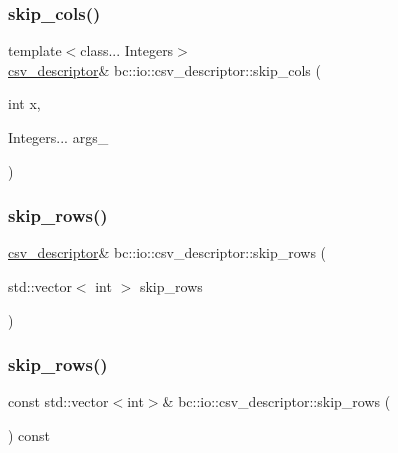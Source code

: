 \subsubsection{\texorpdfstring{skip\+\_\+cols()}{skip\_cols()}\hspace{0.1cm}{\footnotesize\ttfamily [3/3]}}
{\footnotesize\ttfamily template$<$class... Integers$>$ \\
\hyperlink{structbc_1_1io_1_1csv__descriptor}{csv\+\_\+descriptor}\& bc\+::io\+::csv\+\_\+descriptor\+::skip\+\_\+cols (\begin{DoxyParamCaption}\item[{int}]{x,  }\item[{Integers...}]{args\+\_\+ }\end{DoxyParamCaption})\hspace{0.3cm}{\ttfamily [inline]}}

\mbox{\label{structbc_1_1io_1_1csv__descriptor_aee7eba21b2d7bd430dbb8b48c1f3f0e1}} 
\subsubsection{\texorpdfstring{skip\+\_\+rows()}{skip\_rows()}\hspace{0.1cm}{\footnotesize\ttfamily [1/3]}}
{\footnotesize\ttfamily \hyperlink{structbc_1_1io_1_1csv__descriptor}{csv\+\_\+descriptor}\& bc\+::io\+::csv\+\_\+descriptor\+::skip\+\_\+rows (\begin{DoxyParamCaption}\item[{std\+::vector$<$ int $>$}]{skip\+\_\+rows }\end{DoxyParamCaption})\hspace{0.3cm}{\ttfamily [inline]}}

\mbox{\label{structbc_1_1io_1_1csv__descriptor_a1f40717ae361ae4266b7efbcef43284a}} 
\subsubsection{\texorpdfstring{skip\+\_\+rows()}{skip\_rows()}\hspace{0.1cm}{\footnotesize\ttfamily [2/3]}}
{\footnotesize\ttfamily const std\+::vector$<$int$>$\& bc\+::io\+::csv\+\_\+descriptor\+::skip\+\_\+rows (\begin{DoxyParamCaption}{ }\end{DoxyParamCaption}) const\hspace{0.3cm}{\ttfamily [inline]}}

